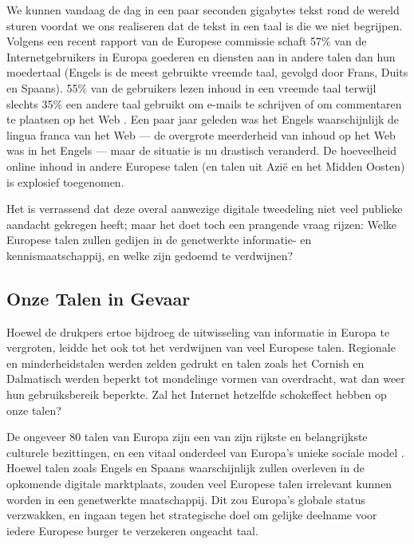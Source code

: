 \documentclass[]{../../metanetpaper}
\begin{document}
\begin{multicols}{2}
    We kunnen vandaag de dag in een paar seconden gigabytes tekst rond de wereld sturen voordat we ons realiseren dat de tekst in een taal is die we niet begrijpen. Volgens een recent rapport van de Europese commissie schaft 57\% van de Internetgebruikers in Europa goederen en diensten aan in andere talen dan hun moedertaal (Engels is de meest gebruikte vreemde taal, gevolgd door Frans, Duits en Spaans). 55\% van de gebruikers lezen inhoud in een vreemde taal terwijl slechts 35\% een andere taal gebruikt om e-mails te schrijven of om commentaren te plaatsen op het Web \cite{EC1}.   Een paar jaar geleden was het Engels waarschijnlijk de lingua franca van het Web --- de overgrote meerderheid van inhoud op het Web was in het Engels --- maar de situatie is nu drastisch veranderd. De hoeveelheid online inhoud in andere Europese talen (en talen uit Azi{\"e} en het Midden Oosten) is explosief toegenomen.

Het is verrassend dat deze overal aanwezige digitale tweedeling niet veel publieke aandacht gekregen heeft; maar het doet toch een prangende vraag rijzen: Welke Europese talen zullen gedijen in de genetwerkte informatie- en kennismaatschappij, en welke zijn gedoemd te verdwijnen?

\subsection{Onze Talen in Gevaar}

    Hoewel de drukpers ertoe bijdroeg de uitwisseling van informatie in Europa te vergroten, leidde het ook tot het verdwijnen van veel Europese talen. Regionale en minderheidstalen werden zelden gedrukt en talen zoals het Cornish en Dalmatisch werden beperkt tot mondelinge vormen van overdracht, wat dan weer hun gebruiksbereik beperkte. Zal het Internet hetzelfde schokeffect hebben op onze talen?


    De ongeveer 80 talen van Europa zijn een van zijn rijkste en belangrijkste culturele bezittingen, en een vitaal onderdeel van Europa's unieke sociale model \cite{EC2}.  Hoewel talen zoals Engels en Spaans waarschijnlijk zullen overleven in de opkomende digitale marktplaats, zouden veel Europese talen irrelevant kunnen worden in een genetwerkte maatschappij. Dit zou Europa's globale status verzwakken, en ingaan tegen het strategische doel om gelijke deelname voor iedere Europese burger te verzekeren ongeacht taal. 


\end{multicols}
\end{document}
